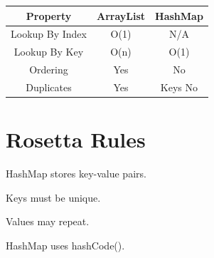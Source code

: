 \documentclass[11pt,a4paper]{book}
\begin{document}
\begin{center}

\begin{tabular}{|c|c|c|}
\hline
Property &
ArrayList &
HashMap \\
\hline

Lookup By Index &
O(1)
&
N/A
\\
\hline

Lookup By Key &
O(n)
&
O(1)
\\
\hline

Ordering &
Yes
&
No
\\
\hline

Duplicates &
Yes
&
Keys No
\\
\hline

\end{tabular}

\end{center}


\section{Rosetta Rules}

\begin{rosettarule}

HashMap stores key-value pairs.

\end{rosettarule}


\begin{rosettarule}

Keys must be unique.

\end{rosettarule}


\begin{rosettarule}

Values may repeat.

\end{rosettarule}


\begin{rosettarule}

HashMap uses hashCode().

\end{rosettarule}
\end{document}
